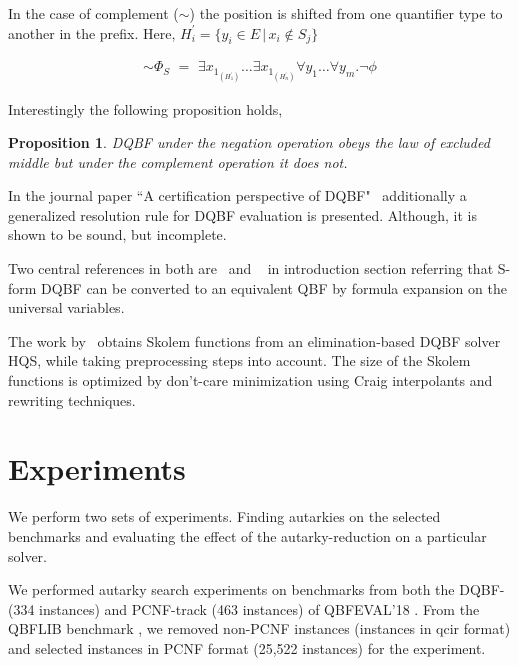 \documentclass[runningheads]{llncs}
\newtheorem{prop}{Proposition}
\begin{document}
In the case of complement ($\sim$) the position is shifted from one quantifier type to another in the prefix. Here, $H^{\prime}_{i} = \{ y_{i} \in E \, | \, x_{i} \notin S_{j} \}$

\begin{align}
\sim \Phi_{S} \,\, =   \,\, \exists x_{1_{(H^{\prime}_1)}}\dots \exists x_{1_{(H^{\prime}_n)}} \forall y_{1}\dots\forall y_{m} . \neg \phi \label{eq4}
\end{align}

Interestingly the following proposition holds,
\begin{prop}
	DQBF under the negation operation obeys the law of excluded middle but under the complement operation it does not.
\end{prop}

In the journal paper ``A certification perspective of DQBF"~\cite{balabanov2014henkin} additionally a generalized resolution rule for DQBF evaluation is presented. Although,  it is shown to be sound, but incomplete.

Two central references in both are~\cite{bubeck2006dependency} and ~\cite{bubeck2010model} in introduction section referring that S-form DQBF can be converted to an equivalent QBF by formula expansion on the universal variables.


The work by~\cite{wimmer2016skolem} obtains Skolem functions from an elimination-based DQBF solver HQS, while taking preprocessing steps into account.
%
The size of the Skolem functions is optimized by don’t-care minimization using Craig interpolants and rewriting techniques.


\section{Experiments}\label{sec:experiments}
We perform two sets of experiments. Finding autarkies on the selected benchmarks and evaluating the effect of the autarky-reduction on a particular solver.

We performed autarky search experiments on benchmarks from both the DQBF- (334 instances) and  PCNF-track (463 instances) of QBFEVAL'18 \cite{Qbfeval18}.
%
From the QBFLIB benchmark \cite{Qbflib}, we removed non-PCNF instances (instances in qcir format) and selected instances in PCNF format (25,522 instances) for the experiment.

\end{document}
